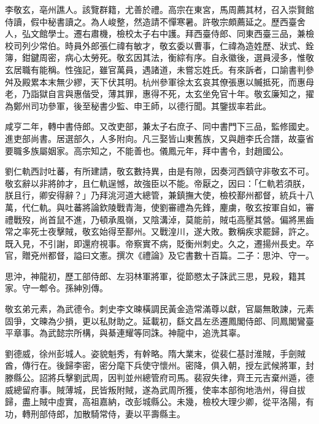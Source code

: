 \begin{pinyinscope}
 李敬玄，亳州譙人。該覽群籍，尤善於禮。高宗在東宮，馬周薦其材，召入崇賢館侍讀，假中秘書讀之。為人峻整，然造請不憚寒暑。許敬宗頗薦延之。歷西臺舍人，弘文館學士。遷右肅機，檢校太子右中護。拜西臺侍郎、同東西臺三品，兼檢校司列少常伯。時員外郎張仁禕有敏才，敬玄委以曹事，仁禕為造姓歷、狀式、銓簿，鉗鍵周密，病心太勞死。敬玄因其法，衡綜有序。自永徽後，選員浸多，惟敬玄居職有能稱。性強記，雖官萬員，遇諸道，未嘗忘姓氏。有來訴者，口諭書判參舛及殿累本末無少繆，天下伏其明。杭州參軍徐太玄哀其僚張惠以贓抵死，而惠母老，乃詣獄自言與惠偕受，薄其罪，惠得不死，太玄坐免官十年。敬玄廉知之，擢為鄭州司功參軍，後至秘書少監、申王師，以德行聞。其鑒拔率若此。



 咸亨二年，轉中書侍郎。又改吏部，兼太子右庶子、同中書門下三品，監修國史。進吏部尚書。居選部久，人多附向。凡三娶皆山東舊族，又與趙李氏合譜，故臺省要職多族屬姻家。高宗知之，不能善也。儀鳳元年，拜中書令，封趙國公。



 劉仁軌西討吐蕃，有所建請，敬玄數持異，由是有隙，因奏河西鎮守非敬玄不可。敬玄辭以非將帥才，且仁軌逞憾，故強臣以不能。帝厭之，因曰：「仁軌若須朕，朕且行，卿安得辭？」乃拜洮河道大總管，兼鎮撫大使，檢校鄯州都督，統兵十八萬，代仁軌。與吐蕃將論欽陵戰青海，使劉審禮為先鋒，麈虜，敬玄按軍自如，審禮戰歿，尚首鼠不進，乃頓承風嶺，又陰溝淖，莫能前，賊屯高壓其營。偏將黑齒常之率死士夜擊賊，敬玄始得至鄯州。又戰湟川，遂大敗。數稱疾求罷歸，許之。既入見，不引謝，即還府視事。帝察實不病，貶衡州刺史。久之，遷揚州長史。卒官，贈兗州都督，謚曰文憲。撰次《禮論》及它書數十百篇。二子：思沖、守一。



 思沖，神龍初，歷工部侍郎、左羽林軍將軍，從節愍太子誅武三思，見殺，籍其家。守一郫令。孫紳別傳。



 敬玄弟元素，為武德令。刺史李文暕橫調民黃金造常滿尊以獻，官屬無敢諫，元素固爭，文暕為少損，更以私財助之。延載初，繇文昌左丞遷鳳閣侍郎、同鳳閣鸞臺平章事。為武懿宗所構，與綦連耀等同誅。神龍中，追洗其辜。



 劉德威，徐州彭城人。姿貌魁秀，有幹略。隋大業末，從裴仁基討淮賊，手劍賊酋，傳行在。後歸李密，密分麾下兵使守懷州。密降，俱入朝，授左武候將軍，封滕縣公。詔將兵擊劉武周，因判並州總管府司馬。裴寂失律，齊王元吉棄州遁，德威總留府事。賊薄城，民皆叛附賊，遂為武周所獲，使率本部徇地浩州，得自拔歸，盡上賊中虛實，高祖嘉納，改彭城縣公。未幾，檢校大理少卿，從平洛陽，有功，轉刑部侍郎，加散騎常侍，妻以平壽縣主。




\end{pinyinscope}
